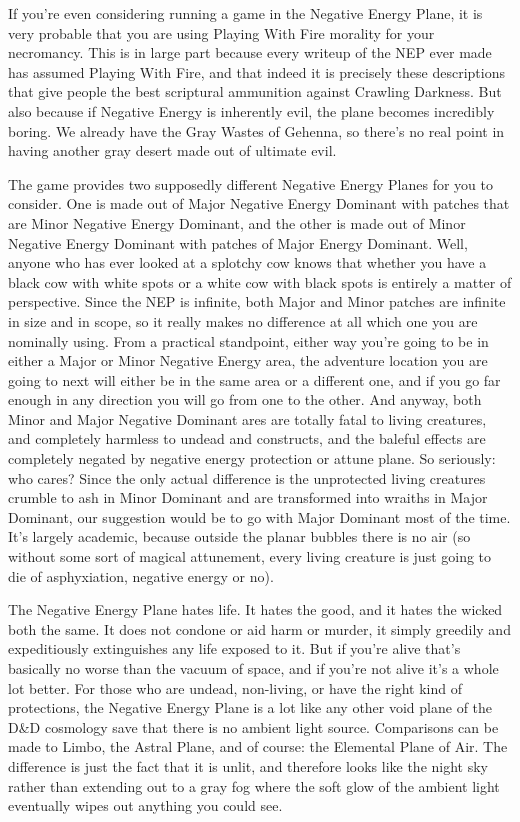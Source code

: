 If you're even considering running a game in the Negative Energy Plane, it is very probable that you are using Playing With Fire morality for your necromancy. This is in large part because every writeup of the NEP ever made has assumed Playing With Fire, and that indeed it is precisely these descriptions that give people the best scriptural ammunition against Crawling Darkness. But also because if Negative Energy is inherently evil, the plane becomes incredibly boring. We already have the Gray Wastes of Gehenna, so there's no real point in having another gray desert made out of ultimate evil.

The game provides two supposedly different Negative Energy Planes for you to consider. One is made out of Major Negative Energy Dominant with patches that are Minor Negative Energy Dominant, and the other is made out of Minor Negative Energy Dominant with patches of Major Energy Dominant. Well, anyone who has ever looked at a splotchy cow knows that whether you have a black cow with white spots or a white cow with black spots is entirely a matter of perspective. Since the NEP is infinite, both Major and Minor patches are infinite in size and in scope, so it really makes no difference at all which one you are nominally using. From a practical standpoint, either way you're going to be in either a Major or Minor Negative Energy area, the adventure location you are going to next will either be in the same area or a different one, and if you go far enough in any direction you will go from one to the other. And anyway, both Minor and Major Negative Dominant ares are totally fatal to living creatures, and completely harmless to undead and constructs, and the baleful effects are completely negated by negative energy protection or attune plane. So seriously: who cares? Since the only actual difference is the unprotected living creatures crumble to ash in Minor Dominant and are transformed into wraiths in Major Dominant, our suggestion would be to go with Major Dominant most of the time. It's largely academic, because outside the planar bubbles there is no air (so without some sort of magical attunement, every living creature is just going to die of asphyxiation, negative energy or no).

The Negative Energy Plane hates life. It hates the good, and it hates the wicked both the same. It does not condone or aid harm or murder, it simply greedily and expeditiously extinguishes any life exposed to it. But if you're alive that's basically no worse than the vacuum of space, and if you're not alive it's a whole lot better. For those who are undead, non-living, or have the right kind of protections, the Negative Energy Plane is a lot like any other void plane of the D\&D cosmology save that there is no ambient light source. Comparisons can be made to Limbo, the Astral Plane, and of course: the Elemental Plane of Air. The difference is just the fact that it is unlit, and therefore looks like the night sky rather than extending out to a gray fog where the soft glow of the ambient light eventually wipes out anything you could see.

